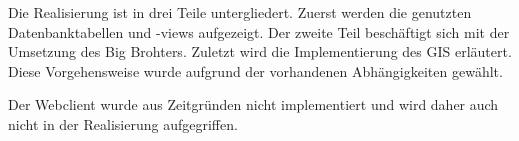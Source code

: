 Die Realisierung ist in drei Teile untergliedert. Zuerst werden die genutzten Datenbanktabellen und -views aufgezeigt. Der zweite Teil beschäftigt sich mit der Umsetzung des Big Brohters. Zuletzt wird die Implementierung des GIS erläutert. Diese Vorgehensweise wurde aufgrund der vorhandenen Abhängigkeiten gewählt.

Der Webclient wurde aus Zeitgründen nicht implementiert und wird daher auch nicht in der Realisierung aufgegriffen.